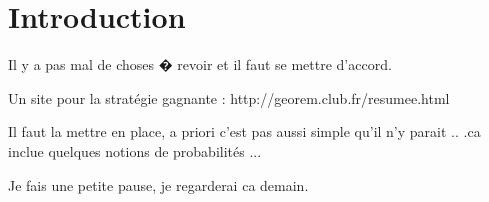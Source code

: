 
\section{Introduction}

Il y a pas mal de choses � revoir et il faut se mettre d'accord.

Un site pour la stratégie gagnante :
http://georem.club.fr/resumee.html

Il faut la mettre en place, a priori c'est pas aussi simple qu'il n'y parait .. .ca inclue quelques notions de probabilités ...

Je fais une petite pause, je regarderai ca demain.